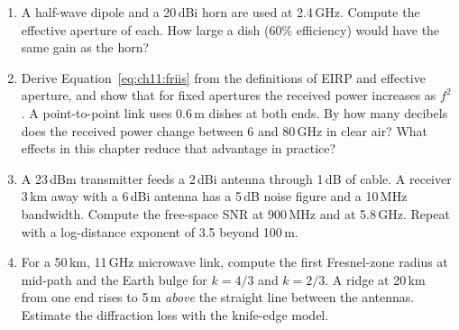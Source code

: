\problems
\begin{enumerate}[label=\thechapter.\arabic*]
\item A half-wave dipole and a 20\,dBi horn are used at 2.4\,GHz. Compute the effective aperture of
each. How large a dish (60\% efficiency) would have the same gain as the horn?
\item Derive Equation~\eqref{eq:ch11:friis} from the definitions of EIRP and effective aperture, and
show that for fixed apertures the received power increases as $f^2$. A point-to-point link uses
0.6\,m dishes at both ends. By how many decibels does the received power change between 6 and
80\,GHz in clear air? What effects in this chapter reduce that advantage in practice?
\begin{center}
\end{center}
\item A 23\,dBm transmitter feeds a 2\,dBi antenna through 1\,dB of cable. A receiver 3\,km away with a
6\,dBi antenna has a 5\,dB noise figure and a 10\,MHz bandwidth. Compute the free-space SNR at 900\,MHz
and at 5.8\,GHz. Repeat with a log-distance exponent of 3.5 beyond 100\,m.
\item For a 50\,km, 11\,GHz microwave link, compute the first Fresnel-zone radius at mid-path and the
Earth bulge for $k=4/3$ and $k=2/3$. A ridge at 20\,km from one end rises to 5\,m \emph{above} the
straight line between the antennas. Estimate the diffraction loss with the knife-edge model.
\begin{center}

\end{center}
\end{enumerate}
